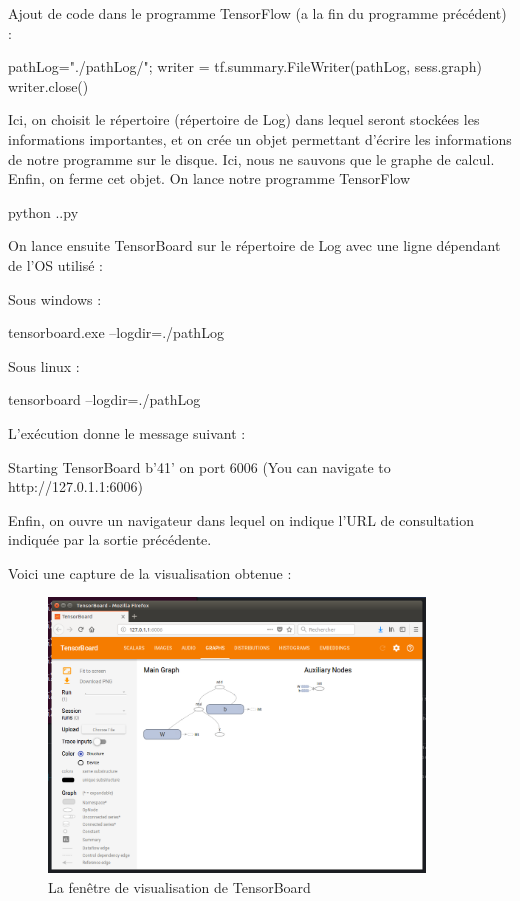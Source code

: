 \documentclass[a4paper,11pt]{book}
\theoremstyle{theo}
\begin{document}
Ajout de code dans le programme TensorFlow (a la fin du programme précédent) :
\begin{mypython}
pathLog="./pathLog/";
writer = tf.summary.FileWriter(pathLog, sess.graph)
writer.close()
\end{mypython}
Ici, on choisit le répertoire (répertoire de Log) dans lequel seront stockées les informations importantes, et on crée un objet permettant d'écrire les informations de notre programme sur le disque. Ici, nous ne sauvons que le graphe de calcul. Enfin, on ferme cet objet.
On lance notre programme TensorFlow 
\begin{mybash}
python .\premiersPas.py
\end{mybash}
On lance ensuite TensorBoard sur le répertoire de Log avec une ligne dépendant de l'OS utilisé :

Sous windows :
\begin{mybash}
tensorboard.exe --logdir=./pathLog
\end{mybash}
Sous linux :
\begin{mybash}
tensorboard --logdir=./pathLog
\end{mybash}

L’exécution donne le message suivant :
\begin{myoutput}
Starting TensorBoard b'41' on port 6006
(You can navigate to http://127.0.1.1:6006)
\end{myoutput}


Enfin, on ouvre un navigateur dans lequel on indique l'URL de consultation indiquée par la sortie précédente.

Voici une capture de la visualisation obtenue :
\begin{figure}[H]

\begin{center}
\includegraphics[width=10cm]{./figures/premierTensorBoard.png} 
\end{center}
\caption{La fenêtre de visualisation de TensorBoard}
\end{figure}
\end{document}
